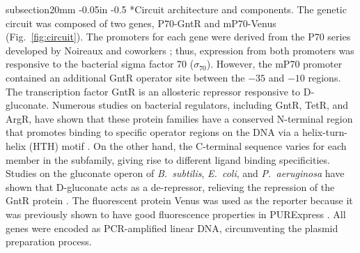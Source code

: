 \documentclass[12pt]{article}
\makeatletter
\renewcommand\subsection{\@startsection
	{subsection}{2}{0mm}
	{-0.05in}
	{-0.5\baselineskip}
	{\normalfont\normalsize\bfseries}}
\makeatother
\begin{document}
\subsection*{Circuit architecture and components.}
The genetic circuit was composed of two genes, P70-GntR and mP70-Venus (Fig.~\ref{fig:circuit}). The promoters for each gene were derived from the P70 series developed by Noireaux and coworkers \cite{shin2010efficient}; thus, expression from both promoters was responsive to the bacterial sigma factor 70 ($\sigma_{70}$). However, the mP70 promoter contained an additional GntR operator site between the $-35$ and $-10$ regions. The transcription factor GntR is an allosteric repressor responsive to D-gluconate. Numerous studies on bacterial regulators, including GntR, TetR, and ArgR, have shown that these protein families have a conserved N-terminal region that promotes binding to specific operator regions on the DNA via a helix-turn-helix (HTH) motif \cite{Cuthbertson_2013,Dimas_2019,Suvorova_2015,Cherney_2008,Miwa1988,Fujita1989}. On the other hand, the C-terminal sequence varies for each member in the subfamily, giving rise to different ligand binding specificities. Studies on the gluconate operon of \textit{B.~subtilis}, \textit{E.~coli}, and \textit{P.~aeruginosa} have shown that D-gluconate acts as a de-repressor, relieving the repression of the GntR protein \cite{Miwa1988,Fujita1989,Peekhaus1998,Yoshida1995,daddaoua2017identification}. The fluorescent protein Venus was used as the reporter because it was previously shown to have good fluorescence properties in PURExpress \cite{lentini2013fluorescent}. All genes were encoded as PCR-amplified linear DNA, circumventing the plasmid preparation process.
\end{document}

